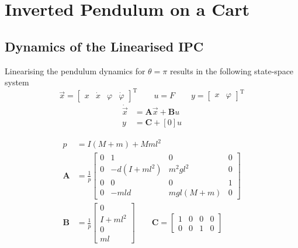 \section{Inverted Pendulum on a Cart}\label{sec:app_sim2}
\graphicspath{{./Bilder/simulation_linear}} 
\subsection{Dynamics of the Linearised IPC}
Linearising the pendulum dynamics for $\theta = \pi $ results in the following state-space system
\begin{equation}
	\vec{x} = 
		\begin{bmatrix}
			x & \dot{x} & \varphi & \dot{\varphi}		
		\end{bmatrix}^\mathrm{T}
		\qquad u = F \qquad 
		y = \begin{bmatrix}
				x  & \varphi	
			\end{bmatrix}^\mathrm{T}
\end{equation}
\begin{align}
	\dot{\vec{x}} &= \mathbf{A} \vec{x} + \mathbf{B} u 	\\		
	y &= \mathbf{C} + [0] u	
\end{align}

\begin{align}
	p &= I(M+m)+M m l^2 \\
	\mathbf{A} &= \frac{1}{p}
		\begin{bmatrix}
			0 			& 1 		  & 0 			& 0			\\
			0			& -d(I+ml^2)  & m^2 g l^2	& 0			\\
			0			& 0			  & 0			& 1			\\
			0			& - m l d  	  & m g l (M+m) & 0
		\end{bmatrix}\\			
	\mathbf{B} &= \frac{1}{p}
		\begin{bmatrix}
			0 \\ I+m l^2 \\ 0 \\ ml		
		\end{bmatrix} 	\qquad
	\mathbf{C} = 
		\begin{bmatrix}
			1 & 0 & 0 & 0	\\
			0 & 0 & 1 & 0	
		\end{bmatrix} 			
\end{align}

